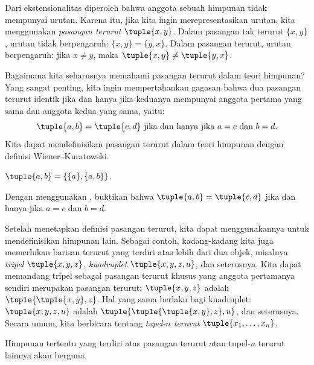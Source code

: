 \documentclass[../../../include/open-logic-section]{subfiles}
\begin{document}

\begin{explain}
Dari ekstensionalitas diperoleh bahwa anggota sebuah himpunan
tidak mempunyai urutan. Karena itu, jika kita ingin merepresentasikan
urutan, kita menggunakan \emph{pasangan terurut} $\tuple{x, y}$.
Dalam pasangan tak terurut $\{x, y\}$, urutan tidak berpengaruh:
$\{x, y\} = \{y, x\}$. Dalam pasangan terurut, urutan berpengaruh:
jika $x \neq y$, maka $\tuple{x, y} \neq \tuple{y, x}$.

Bagaimana kita seharusnya memahami pasangan terurut dalam teori
himpunan? Yang sangat penting, kita ingin mempertahankan gagasan bahwa
dua pasangan terurut identik jika dan hanya jika keduanya mempunyai
anggota pertama yang sama dan anggota kedua yang sama, yaitu:
\[
  \tuple{a, b}= \tuple{c, d}\text{ jika dan hanya jika }a = c
  \text{ dan }b=d.
\]
Kita dapat mendefinisikan pasangan terurut dalam teori himpunan dengan
definisi Wiener--Kuratowski.
\end{explain}

\begin{defn}
	$\tuple{a, b} = \{\{a\}, \{a, b\}\}$.
\end{defn}

\begin{prob}
	Dengan menggunakan , buktikan
	bahwa $\tuple{a, b}= \tuple{c, d}$ jika dan hanya jika $a = c$ dan
	$b=d$.
\end{prob}

\begin{explain}
Setelah menetapkan definisi pasangan terurut, kita dapat menggunakannya
untuk mendefinisikan himpunan lain. Sebagai contoh, kadang-kadang kita
juga memerlukan barisan terurut yang terdiri atas lebih dari dua objek,
misalnya \emph{tripel} $\tuple{x, y, z}$, \emph{kuadruplet}
$\tuple{x, y, z, u}$, dan seterusnya. Kita dapat memandang tripel
sebagai pasangan terurut khusus yang anggota pertamanya sendiri
merupakan pasangan terurut: $\tuple{x, y, z}$ adalah
$\tuple{\tuple{x, y},z}$. Hal yang sama berlaku bagi kuadruplet:
$\tuple{x,y,z,u}$ adalah $\tuple{\tuple{\tuple{x,y},z},u}$, dan
seterusnya. Secara umum, kita berbicara tentang \emph{tupel-$n$
terurut} $\tuple{x_1, \dots, x_n}$.

Himpunan tertentu yang terdiri atas pasangan terurut atau tupel-$n$
terurut lainnya akan berguna.
\end{explain}
\end{document}
